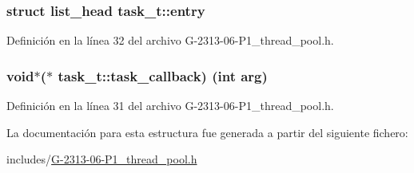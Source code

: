\subsubsection[{\texorpdfstring{entry}{entry}}]{\setlength{\rightskip}{0pt plus 5cm}struct {\bf list\+\_\+head} task\+\_\+t\+::entry}\hypertarget{structtask__t_ac812553758f9102a7a674ad29e78f98b}{}\label{structtask__t_ac812553758f9102a7a674ad29e78f98b}


Definición en la línea 32 del archivo G-\/2313-\/06-\/\+P1\+\_\+thread\+\_\+pool.\+h.

\subsubsection[{\texorpdfstring{task\+\_\+callback}{task_callback}}]{\setlength{\rightskip}{0pt plus 5cm}void$\ast$($\ast$ task\+\_\+t\+::task\+\_\+callback) (int {\bf arg})}\hypertarget{structtask__t_ac8c2d416888e415fc6ee54410a4c511c}{}\label{structtask__t_ac8c2d416888e415fc6ee54410a4c511c}


Definición en la línea 31 del archivo G-\/2313-\/06-\/\+P1\+\_\+thread\+\_\+pool.\+h.



La documentación para esta estructura fue generada a partir del siguiente fichero\+:\begin{DoxyCompactItemize}
\item 
includes/\hyperlink{G-2313-06-P1__thread__pool_8h}{G-\/2313-\/06-\/\+P1\+\_\+thread\+\_\+pool.\+h}\end{DoxyCompactItemize}
